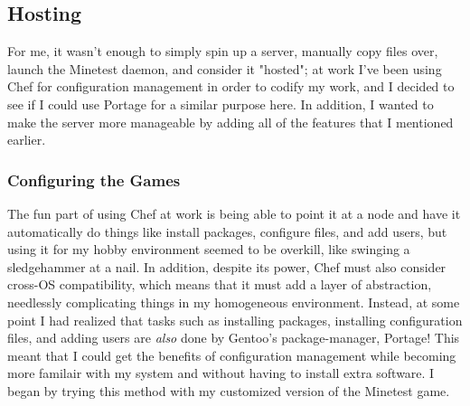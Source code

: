 \documentclass{article}
\begin{document}
\subsection{Hosting}
For me, it wasn't enough to simply spin up a server, manually copy files over, launch the Minetest daemon, and consider it "hosted"; at work I've been using Chef for configuration management in order to codify my work, and I decided to see if I could use Portage for a similar purpose here.  In addition, I wanted to make the server more manageable by adding all of the features that I mentioned earlier.

\subsubsection{Configuring the Games}
The fun part of using Chef at work is being able to point it at a node and have it automatically do things like install packages, configure files, and add users, but using it for my hobby environment seemed to be overkill, like swinging a sledgehammer at a nail.  In addition, despite its power, Chef must also consider cross-OS compatibility, which means that it must add a layer of abstraction, needlessly complicating things in my homogeneous environment.  Instead, at some point I had realized that tasks such as installing packages, installing configuration files, and adding users are \emph{also} done by Gentoo's package-manager, Portage!  This meant that I could get the benefits of configuration management while becoming more familair with my system and without having to install extra software.  I began by trying this method with my customized version of the Minetest game.
\end{document}
